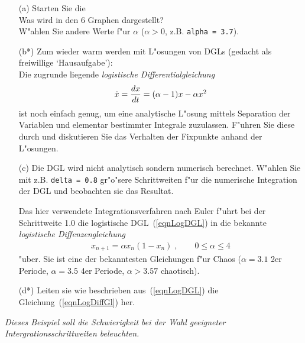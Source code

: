 \documentclass{article}
\begin{document}
\begin{itemize}

\item[(a)] Starten Sie die  \\
Was wird in den 6 Graphen dargestellt?\\
W"ahlen Sie andere Werte f"ur $\alpha$ ($\alpha>0$, z.B. \texttt{alpha = 3.7}).

\item[(b*)] Zum wieder warm werden mit L"osungen von DGLs (gedacht als
freiwillige `Hausaufgabe'):\\
Die zugrunde liegende {\em logistische Differentialgleichung}
\begin{eqnarray}    \label{eqnLogDGL}
  \dot{x} = {dx \over dt} = (\alpha - 1) x - \alpha x^2
\end{eqnarray}
ist noch einfach genug, um eine analytische L"osung mittels
Separation der Variablen und elementar bestimmter Integrale zuzulassen.
F"uhren Sie diese durch und diskutieren Sie das Verhalten der Fixpunkte
anhand der L"osungen.

\item[(c)] Die DGL wird nicht analytisch sondern
numerisch berechnet. W"ahlen Sie mit z.B. \texttt{delta = 0.8}
gr"o"sere Schrittweiten f"ur die numerische Integration der DGL und
beobachten sie das Resultat.

Das hier verwendete Integrationsverfahren nach Euler f"uhrt  bei
der Schrittweite 1.0 die logistische DGL~(\ref{eqnLogDGL}) in die 
bekannte {\em logistische Diffenzengleichung}
\begin{eqnarray}    \label{eqnLogDiffGl}
  x_{n+1} = \alpha x_n (1 - x_n)\;, \qquad 0 \leq \alpha \leq 4
\end{eqnarray}
"uber. Sie ist eine der bekanntesten Gleichungen f"ur Chaos ($\alpha=3.1$
2er Periode, $\alpha=3.5$ 4er Periode, $\alpha>3.57$ chaotisch).

\item[(d*)] Leiten sie wie beschrieben aus~(\ref{eqnLogDGL})
die Gleichung~(\ref{eqnLogDiffGl}) her.

\end{itemize}

\vspace{.5em}
{\em Dieses Beispiel soll die Schwierigkeit bei der Wahl geeigneter
Intergrationsschrittweiten beleuchten.}


\end{document}
